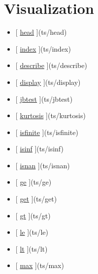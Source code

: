 \documentclass[letterpaper,10pt,english]{sphinxmanual}
\begin{document}
\section{Visualization}
\label{classes/time_series/@ts/ts:visualization}\begin{itemize}
\item {} 
{[} {\hyperref[classes/time_series/@ts/ts:head]{head}} {]}(ts/head)

\item {} 
{[} {\hyperref[classes/time_series/@ts/ts:index]{index}} {]}(ts/index)

\item {} 
{[} {\hyperref[classes/time_series/@ts/ts:describe]{describe}} {]}(ts/describe)

\item {} 
{[} {\hyperref[classes/time_series/@ts/ts:display]{display}} {]}(ts/display)

\item {} 
{[} {\hyperref[classes/time_series/@ts/ts:jbtest]{jbtest}} {]}(ts/jbtest)

\item {} 
{[} {\hyperref[classes/time_series/@ts/ts:kurtosis]{kurtosis}} {]}(ts/kurtosis)

\item {} 
{[} {\hyperref[classes/time_series/@ts/ts:isfinite]{isfinite}} {]}(ts/isfinite)

\item {} 
{[} {\hyperref[classes/time_series/@ts/ts:isinf]{isinf}} {]}(ts/isinf)

\item {} 
{[} {\hyperref[classes/time_series/@ts/ts:isnan]{isnan}} {]}(ts/isnan)

\item {} 
{[} {\hyperref[classes/time_series/@ts/ts:ge]{ge}} {]}(ts/ge)

\item {} 
{[} {\hyperref[classes/time_series/@ts/ts:get]{get}} {]}(ts/get)

\item {} 
{[} {\hyperref[classes/time_series/@ts/ts:gt]{gt}} {]}(ts/gt)

\item {} 
{[} {\hyperref[classes/time_series/@ts/ts:le]{le}} {]}(ts/le)

\item {} 
{[} {\hyperref[classes/time_series/@ts/ts:lt]{lt}} {]}(ts/lt)

\item {} 
{[} {\hyperref[classes/time_series/@ts/ts:max]{max}} {]}(ts/max)


\end{itemize}
\end{document}
